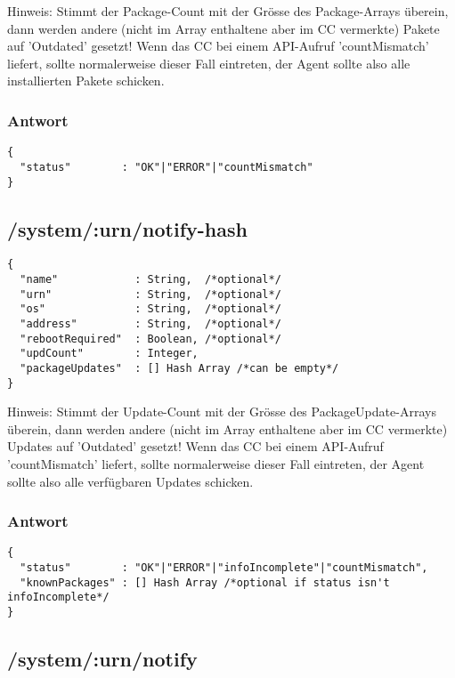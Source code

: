 Hinweis: Stimmt der Package-Count mit der Grösse des Package-Arrays überein, dann werden andere (nicht im Array enthaltene aber im CC vermerkte) Pakete auf 'Outdated' gesetzt! Wenn das CC bei einem API-Aufruf 'countMismatch' liefert, sollte normalerweise dieser Fall eintreten, der Agent sollte also alle installierten Pakete schicken.


\subsubsection*{Antwort}

\begin{verbatim}
{
  "status"        : "OK"|"ERROR"|"countMismatch" 
}
\end{verbatim}

\subsection*{/system/:urn/notify-hash}

\begin{verbatim}
{
  "name"            : String,  /*optional*/
  "urn"             : String,  /*optional*/
  "os"              : String,  /*optional*/
  "address"         : String,  /*optional*/
  "rebootRequired"  : Boolean, /*optional*/
  "updCount"        : Integer,
  "packageUpdates"  : [] Hash Array /*can be empty*/
}
\end{verbatim}

Hinweis: Stimmt der Update-Count mit der Grösse des PackageUpdate-Arrays überein, dann werden andere (nicht im Array enthaltene aber im CC vermerkte) Updates auf 'Outdated' gesetzt! Wenn das CC bei einem API-Aufruf 'countMismatch' liefert, sollte normalerweise dieser Fall eintreten, der Agent sollte also alle verfügbaren Updates schicken.


\subsubsection*{Antwort}

\begin{verbatim}
{
  "status"        : "OK"|"ERROR"|"infoIncomplete"|"countMismatch",
  "knownPackages" : [] Hash Array /*optional if status isn't infoIncomplete*/
}
\end{verbatim}

\subsection*{/system/:urn/notify}

